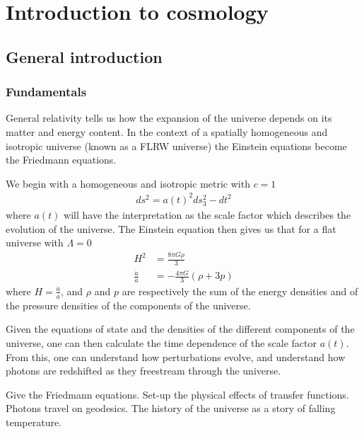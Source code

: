 %
\chapter{Introduction to cosmology}\label{chapter:intro_general}
\section{General introduction}\label{sec:general_intro}
    \subsection{Fundamentals}
    General relativity tells us how the expansion of the universe depends
    on its matter and energy content.
    In the context of a spatially homogeneous and isotropic universe
    (known as a FLRW universe)
    the Einstein equations become the Friedmann equations.


    We begin with a homogeneous and isotropic metric with $c=1$
    \begin{align}
        ds^2 = a(t)^2 ds_3^2 - dt^2
    \end{align}
    where $a(t)$ will have the interpretation as the scale factor
    which describes the evolution of the universe.
    The Einstein equation then gives us that
    for a flat universe with $\Lambda=0$
    \begin{align}
        H^2 &= \frac{8\pi G \rho}{3}\\
        \frac{\ddot{a}}{a} &= -\frac{4\pi G}{3}\left(\rho+3p\right)
    \end{align}
    where $H=\frac{\dot{a}}{a}$, and $\rho$ and $p$ are respectively the sum of the
    energy densities and of the pressure densities of the
    components of the universe.

    Given the equations of state and the densities of the different
    components of the universe, one can then calculate the time dependence of the
    scale factor $a(t)$. From this, one can understand how perturbations evolve, and understand
    how photons are redshifted as they freestream through the universe.


    Give the Friedmann equations.
    Set-up the physical effects of transfer functions. Photons travel on geodesics.
\newpage
    The history of the universe as a story of falling temperature.
\newpage
